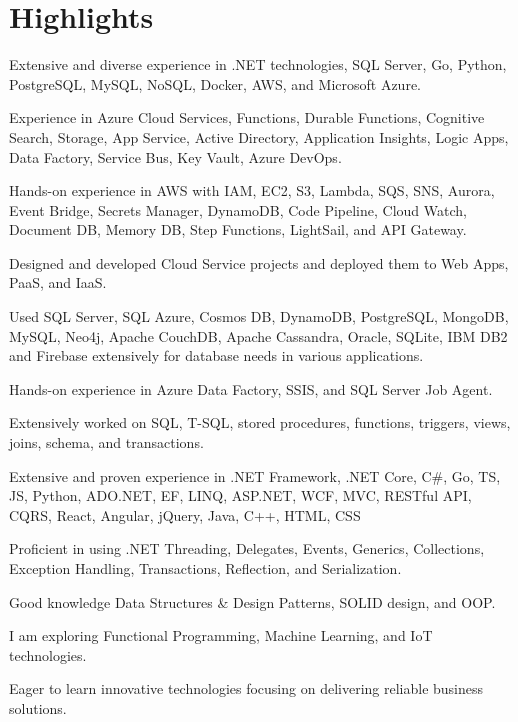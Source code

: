 \documentclass[letterpaper]{cv_12} %
\begin{document}
\begin{minipage}[t]{0.66\textwidth} %


\section{Highlights}

\vspace{\topsep}
\begin{tightitemize}
\item Extensive and diverse experience in .NET technologies, SQL Server, Go, Python, PostgreSQL, MySQL, NoSQL, Docker, AWS, and Microsoft Azure.
\item Experience in Azure Cloud Services, Functions, Durable Functions, Cognitive Search, Storage, App Service, Active Directory, Application Insights, Logic Apps, Data Factory, Service Bus, Key Vault, Azure DevOps.
\item Hands-on experience in AWS with IAM, EC2, S3, Lambda, SQS, SNS, Aurora, Event Bridge, Secrets Manager, DynamoDB, Code Pipeline, Cloud Watch, Document DB, Memory DB, Step Functions, LightSail, and API Gateway.
\item Designed and developed Cloud Service projects and deployed them to Web Apps, PaaS, and IaaS.
\item Used SQL Server, SQL Azure, Cosmos DB, DynamoDB, PostgreSQL, MongoDB, MySQL, Neo4j, Apache CouchDB, Apache Cassandra, Oracle, SQLite, IBM DB2 and Firebase extensively for database needs in various applications.
\item Hands-on experience in Azure Data Factory, SSIS, and SQL Server Job Agent.
\item Extensively worked on SQL, T-SQL, stored procedures, functions, triggers, views, joins, schema, and transactions.
\item Extensive and proven experience in .NET Framework, .NET Core, C\#, Go, TS, JS, Python, ADO.NET, EF, LINQ, ASP.NET, WCF, MVC, RESTful API, CQRS, React, Angular, jQuery, Java, C++, HTML, CSS\@
\item Proficient in using .NET Threading, Delegates, Events, Generics, Collections, Exception Handling, Transactions, Reflection, and Serialization.
\item Good knowledge Data Structures \& Design Patterns, SOLID design, and OOP.\@
\item I am exploring Functional Programming, Machine Learning, and IoT technologies.
\item Eager to learn innovative technologies focusing on delivering reliable business solutions.\@
\end{tightitemize}


\end{minipage}
\end{document}
